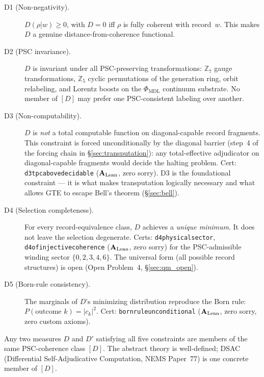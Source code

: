 \documentclass[11pt,openany]{book}
\theoremstyle{remark}
\newcommand{\MDL}{\text{MDL}}
\newcommand{\lean}[1]{%
  \penalty-100
  \begingroup\def\_{\textunderscore\allowbreak}\texttt{#1}\endgroup}
\newcommand{\CatAL}{\ensuremath{\textbf{A}_{\rm Lean}}}
\begin{document}
\begin{description}

\item[D1 (Non-negativity).]
  $D(\rho|w) \geq 0$, with $D = 0$ iff $\rho$ is fully coherent with record~$w$.
  This makes $D$ a genuine distance-from-coherence functional.

\item[D2 (PSC invariance).]
  $D$ is invariant under all PSC-preserving transformations: $\mathbb{Z}_7$ gauge
  transformations, $\mathbb{Z}_5$ cyclic permutations of the generation ring, orbit
  relabeling, and Lorentz boosts on the $\Phi_{\MDL}$ continuum substrate.
  No member of $[D]$ may prefer one PSC-consistent labeling over another.

\item[D3 (Non-computability).]
  $D$ is \emph{not} a total computable function on diagonal-capable record fragments.
  This constraint is forced unconditionally by the diagonal barrier (step~4 of the
  forcing chain in §\ref{sec:transputation}): any total-effective adjudicator on
  diagonal-capable fragments would decide the halting problem.
  Cert: \lean{d3\_tpc\_above\_decidable} (\CatAL, zero sorry).
  D3 is the foundational constraint --- it is what makes transputation logically
  necessary and what allows GTE to escape Bell's theorem (§\ref{sec:bell}).

\item[D4 (Selection completeness).]
  For every record-equivalence class, $D$ achieves a \emph{unique minimum}.  It does
  not leave the selection degenerate.  Certs: \lean{d4\_physical\_sector},
  \lean{d4\_of\_injective\_coherence} (\CatAL, zero sorry) for the PSC-admissible
  winding sector $\{0,2,3,4,6\}$.  The universal form (all possible record structures)
  is open (Open Problem~4, §\ref{sec:qm_open}).

\item[D5 (Born-rule consistency).]
  The marginals of $D$'s minimizing distribution reproduce the Born rule:
  $P(\text{outcome } k) = |c_k|^2$.
  Cert: \lean{born\_rule\_unconditional} (\CatAL, zero sorry, zero custom axioms).

\end{description}

Any two measures $D$ and $D'$ satisfying all five constraints are members of the same
PSC-coherence class $[D]$.  The abstract theory is well-defined; DSAC (Differential
Self-Adjudicative Computation, NEMS Paper~77) is one concrete member of $[D]$.
\end{document}
